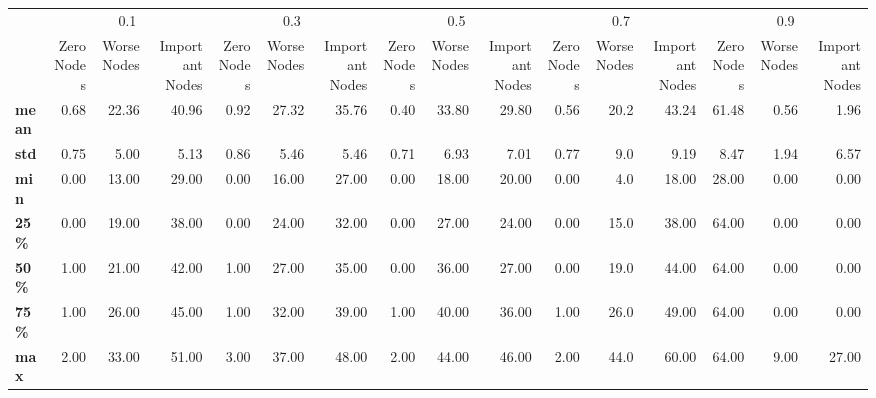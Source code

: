 \begin{tabular}{lrrrrrrrrrrrrrrr}
\toprule
{} & \multicolumn{3}{c}{0.1} & \multicolumn{3}{c}{0.3} & \multicolumn{3}{c}{0.5} & \multicolumn{3}{c}{0.7} & \multicolumn{3}{c}{0.9} \\
{} & Zero Nodes & Worse Nodes & Important Nodes & Zero Nodes & Worse Nodes & Important Nodes & Zero Nodes & Worse Nodes & Important Nodes & Zero Nodes & Worse Nodes & Important Nodes & Zero Nodes & Worse Nodes & Important Nodes \\
\midrule
\textbf{mean} &       0.68 &       22.36 &           40.96 &       0.92 &       27.32 &           35.76 &       0.40 &       33.80 &           29.80 &       0.56 &        20.2 &           43.24 &      61.48 &        0.56 &            1.96 \\
\textbf{std } &       0.75 &        5.00 &            5.13 &       0.86 &        5.46 &            5.46 &       0.71 &        6.93 &            7.01 &       0.77 &         9.0 &            9.19 &       8.47 &        1.94 &            6.57 \\
\textbf{min } &       0.00 &       13.00 &           29.00 &       0.00 &       16.00 &           27.00 &       0.00 &       18.00 &           20.00 &       0.00 &         4.0 &           18.00 &      28.00 &        0.00 &            0.00 \\
\textbf{25\% } &       0.00 &       19.00 &           38.00 &       0.00 &       24.00 &           32.00 &       0.00 &       27.00 &           24.00 &       0.00 &        15.0 &           38.00 &      64.00 &        0.00 &            0.00 \\
\textbf{50\% } &       1.00 &       21.00 &           42.00 &       1.00 &       27.00 &           35.00 &       0.00 &       36.00 &           27.00 &       0.00 &        19.0 &           44.00 &      64.00 &        0.00 &            0.00 \\
\textbf{75\% } &       1.00 &       26.00 &           45.00 &       1.00 &       32.00 &           39.00 &       1.00 &       40.00 &           36.00 &       1.00 &        26.0 &           49.00 &      64.00 &        0.00 &            0.00 \\
\textbf{max } &       2.00 &       33.00 &           51.00 &       3.00 &       37.00 &           48.00 &       2.00 &       44.00 &           46.00 &       2.00 &        44.0 &           60.00 &      64.00 &        9.00 &           27.00 \\
\bottomrule
\end{tabular}
